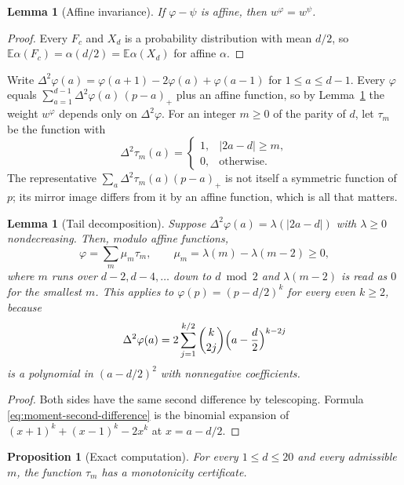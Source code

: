 \documentclass[11pt]{amsart}
\newtheorem{proposition}[theorem]{Proposition}
\newtheorem{lemma}[theorem]{Lemma}
\theoremstyle{definition}
\theoremstyle{remark}
\newcommand{\E}{\mathbb E}
\begin{document}
\begin{lemma}[Affine invariance]
\label{lem:affine}
If $\varphi-\psi$ is affine, then $w^{\varphi}=w^{\psi}$.
\end{lemma}

\begin{proof}
Every $F_c$ and $X_d$ is a probability distribution with mean $d/2$, so
$\E\alpha(F_c)=\alpha(d/2)=\E\alpha(X_d)$ for affine $\alpha$.
\end{proof}

Write $\Delta^2\varphi(a)=\varphi(a+1)-2\varphi(a)+\varphi(a-1)$ for
$1\le a\le d-1$.  Every $\varphi$ equals
$\sum_{a=1}^{d-1}\Delta^2\varphi(a)\,(p-a)_+$ plus an affine function, so by
Lemma~\ref{lem:affine} the weight $w^{\varphi}$ depends only on
$\Delta^2\varphi$.  For an integer $m\ge0$ of the parity of $d$, let
$\tau_m$ be the function with
\[
 \Delta^2\tau_m(a)=\begin{cases}1,&|2a-d|\ge m,\\0,&\text{otherwise.}
 \end{cases}
\]
The representative $\sum_a\Delta^2\tau_m(a)(p-a)_+$ is not itself a
symmetric function of $p$; its mirror image differs from it by an affine
function, which is all that matters.

\begin{lemma}[Tail decomposition]
\label{lem:tail-decomposition}
Suppose $\Delta^2\varphi(a)=\lambda(|2a-d|)$ with $\lambda\ge0$
nondecreasing.  Then, modulo affine functions,
\[
 \varphi=\sum_m\mu_m\tau_m,\qquad
 \mu_m=\lambda(m)-\lambda(m-2)\ge0,
\]
where $m$ runs over $d-2,d-4,\ldots$ down to $d \bmod 2$ and
$\lambda(m-2)$ is read as $0$ for the smallest $m$.  This applies to
$\varphi(p)=(p-d/2)^k$ for every even $k\ge2$, because
\begin{equation}
 \Delta^2\varphi(a)=2\sum_{j=1}^{k/2}\binom{k}{2j}\Bigl(a-\frac d2\Bigr)^{k-2j}
 \label{eq:moment-second-difference}
\end{equation}
is a polynomial in $(a-d/2)^2$ with nonnegative coefficients.
\end{lemma}

\begin{proof}
Both sides have the same second difference by telescoping.  Formula
\eqref{eq:moment-second-difference} is the binomial expansion of
$(x+1)^k+(x-1)^k-2x^k$ at $x=a-d/2$.
\end{proof}

\begin{proposition}[Exact computation]
\label{prop:finite-scan}
For every $1\le d\le20$ and every admissible $m$, the function $\tau_m$ has
a monotonicity certificate.
\end{proposition}
\end{document}
